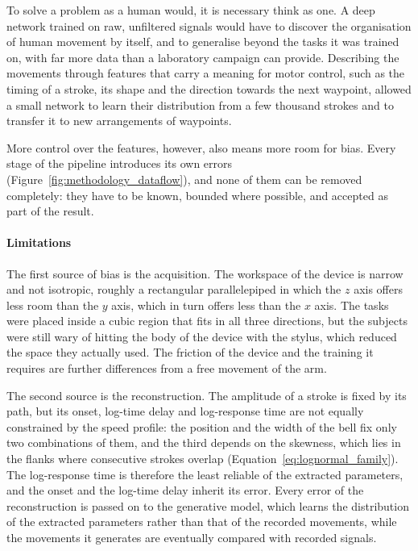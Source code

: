 \documentclass[12pt]{report}
\begin{document}
To solve a problem as a human would, it is necessary think as one. A deep network trained on raw, unfiltered signals would have to discover the organisation of human movement by itself, and to generalise beyond the tasks it was trained on, with far more data than a laboratory campaign can provide. Describing the movements through features that carry a meaning for motor control, such as the timing of a stroke, its shape and the direction towards the next waypoint, allowed a small network to learn their distribution from a few thousand strokes and to transfer it to new arrangements of waypoints.

More control over the features, however, also means more room for bias. Every stage of the pipeline introduces its own errors (Figure~\ref{fig:methodology_dataflow}), and none of them can be removed completely: they have to be known, bounded where possible, and accepted as part of the result.

\paragraph{Limitations}
The first source of bias is the acquisition. The workspace of the device is narrow and not isotropic, roughly a rectangular parallelepiped in which the $z$ axis offers less room than the $y$ axis, which in turn offers less than the $x$ axis. The tasks were placed inside a cubic region that fits in all three directions, but the subjects were still wary of hitting the body of the device with the stylus, which reduced the space they actually used. The friction of the device and the training it requires are further differences from a free movement of the arm.

The second source is the reconstruction. The amplitude of a stroke is fixed by its path, but its onset, log-time delay and log-response time are not equally constrained by the speed profile: the position and the width of the bell fix only two combinations of them, and the third depends on the skewness, which lies in the flanks where consecutive strokes overlap (Equation~\eqref{eq:lognormal_family}). The log-response time is therefore the least reliable of the extracted parameters, and the onset and the log-time delay inherit its error. Every error of the reconstruction is passed on to the generative model, which learns the distribution of the extracted parameters rather than that of the recorded movements, while the movements it generates are eventually compared with recorded signals.
\end{document}
